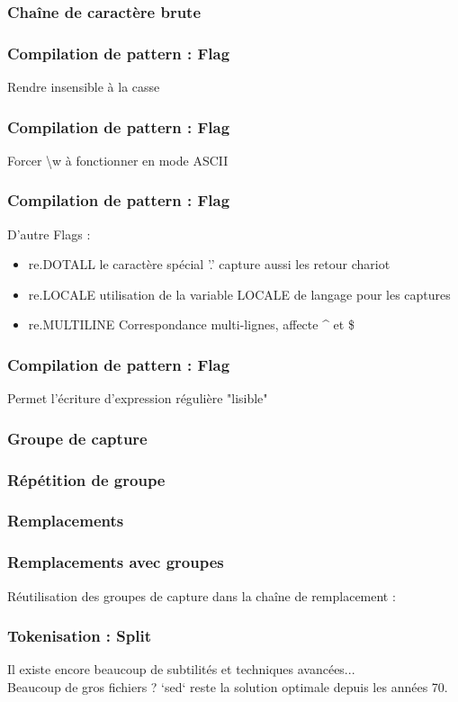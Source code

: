 \begin{frame}
  \frametitle{Chaîne de caractère brute}
\end{frame}

\begin{frame}
  \frametitle{Compilation de pattern : Flag}
  Rendre insensible à la casse
\end{frame}

\begin{frame}
  \frametitle{Compilation de pattern : Flag}
  Forcer \textbackslash w à fonctionner en mode ASCII
\end{frame}

\begin{frame}
  \frametitle{Compilation de pattern : Flag}
  D'autre Flags :
  \begin{itemize}
  \item re.DOTALL le caractère spécial '.' capture aussi les retour chariot
  \item re.LOCALE utilisation de la variable LOCALE de langage pour les captures
  \item re.MULTILINE Correspondance multi-lignes, affecte \^{} et \$
  \end{itemize}
\end{frame}

\begin{frame}
  \frametitle{Compilation de pattern : Flag}
  Permet l'écriture d'expression régulière "lisible"
\end{frame}

\begin{frame}
  \frametitle{Groupe de capture}
\end{frame}

\begin{frame}
  \frametitle{Répétition de groupe}
\end{frame}

\begin{frame}
  \frametitle{Remplacements}
\end{frame}

\begin{frame}
  \frametitle{Remplacements avec groupes}
  Réutilisation des groupes de capture dans la chaîne de remplacement :
\end{frame}

\begin{frame}
  \frametitle{Tokenisation : Split}
\end{frame}

\begin{frame}
  Il existe encore beaucoup de subtilités et techniques avancées...\\
  \newline
  Beaucoup de gros fichiers ? `sed` reste la solution optimale depuis les années 70.
\end{frame}
